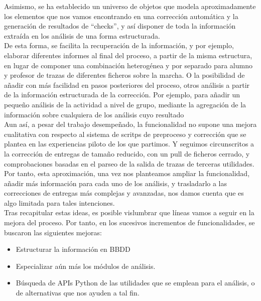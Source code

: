Asimismo, se ha establecido un universo de objetos que modela aproximadamente los elementos que nos vamos encontrando en una corrección automática y la generación de resultados de ``checks'', y así disponer de toda la información extraída en los análisis de una forma estructurada.\\


De esta forma, se facilita la recuperación de la información, y por ejemplo, elaborar diferentes informes al final del proceso, a partir de la misma estructura, en lugar de componer  una combinación heterogénea y por separado para alumno y profesor de trazas de diferentes ficheros sobre la marcha. O la posibilidad de añadir con más facilidad en pasos posteriores del proceso, otros análisis a partir de la información estructurada de la corrección. Por ejemplo, para añadir un pequeño análisis de la actividad a nivel de grupo, mediante la agregación de la información sobre cualquiera de los análisis cuyo resultado\\


Aun así, a pesar del trabajo desempeñado, la funcionalidad no supone una mejora cualitativa con respecto al sistema de scritps de preproceso y corrección que se plantea en las experiencias piloto de los que partimos. Y seguimos circunscritos a la corrección de entregas de tamaño reducido, con un pull de ficheros cerrado, y comprobaciones basadas en el parseo de la salida de trazas de terceras utilidades.\\


Por tanto, esta aproximación, una vez nos planteamos ampliar la funcionalidad, añadir más información para cada uno de los análisis, y trasladarlo a las correcciones de entregas más complejas y avanzadas, nos damos cuenta que es algo limitada para tales intenciones.\\


Tras recapitular estas ideas, es posible vislumbrar que líneas vamos a seguir en la mejora del proceso. Por tanto, en los sucesivos incrementos de funcionalidades, se buscaron las siguientes mejoras:\\

\begin{itemize}
\item Estructurar la información en BBDD\\

\item Especializar aún más los módulos de análisis.\\

\item Búsqueda de APIs Python de las utilidades que se emplean para el análisis, o de alternativas que nos ayuden a tal fin.\\
\end{itemize}

